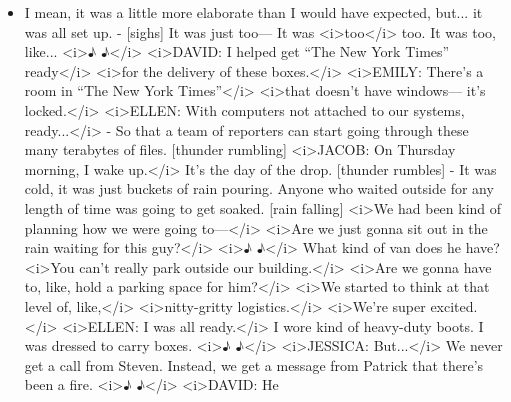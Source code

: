 \begin{itemize}
  \begin{itemize}
  \tightlist
  \item
    I mean, it was a little more elaborate than I would have expected,
    but... it was all set up. - {[}sighs{]} It was just too--- It was
    \textless{}i\textgreater{}too\textless{}/i\textgreater{} too. It was
    too, like... \textless{}i\textgreater{}♪
    ♪\textless{}/i\textgreater{} \textless{}i\textgreater{}DAVID: I
    helped get ``The New York Times'' ready\textless{}/i\textgreater{}
    \textless{}i\textgreater{}for the delivery of these
    boxes.\textless{}/i\textgreater{} \textless{}i\textgreater{}EMILY:
    There's a room in ``The New York Times''\textless{}/i\textgreater{}
    \textless{}i\textgreater{}that doesn't have windows--- it's
    locked.\textless{}/i\textgreater{} \textless{}i\textgreater{}ELLEN:
    With computers not attached to our systems,
    ready...\textless{}/i\textgreater{} - So that a team of reporters
    can start going through these many terabytes of files. {[}thunder
    rumbling{]} \textless{}i\textgreater{}JACOB: On Thursday morning, I
    wake up.\textless{}/i\textgreater{} It's the day of the drop.
    {[}thunder rumbles{]} - It was cold, it was just buckets of rain
    pouring. Anyone who waited outside for any length of time was going
    to get soaked. {[}rain falling{]} \textless{}i\textgreater{}We had
    been kind of planning how we were going
    to---\textless{}/i\textgreater{} \textless{}i\textgreater{}Are we
    just gonna sit out in the rain waiting for this
    guy?\textless{}/i\textgreater{} \textless{}i\textgreater{}♪
    ♪\textless{}/i\textgreater{} What kind of van does he have?
    \textless{}i\textgreater{}You can't really park outside our
    building.\textless{}/i\textgreater{} \textless{}i\textgreater{}Are
    we gonna have to, like, hold a parking space for
    him?\textless{}/i\textgreater{} \textless{}i\textgreater{}We started
    to think at that level of, like,\textless{}/i\textgreater{}
    \textless{}i\textgreater{}nitty-gritty
    logistics.\textless{}/i\textgreater{}
    \textless{}i\textgreater{}We're super
    excited.\textless{}/i\textgreater{} \textless{}i\textgreater{}ELLEN:
    I was all ready.\textless{}/i\textgreater{} I wore kind of
    heavy-duty boots. I was dressed to carry boxes.
    \textless{}i\textgreater{}♪ ♪\textless{}/i\textgreater{}
    \textless{}i\textgreater{}JESSICA: But...\textless{}/i\textgreater{}
    We never get a call from Steven. Instead, we get a message from
    Patrick that there's been a fire. \textless{}i\textgreater{}♪
    ♪\textless{}/i\textgreater{} \textless{}i\textgreater{}DAVID: He

\end{itemize}
\end{itemize}
